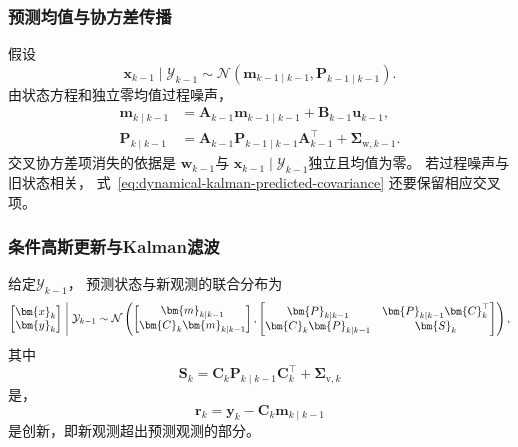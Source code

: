 \subsubsection{预测均值与协方差传播}

假设
\[
	\bm{x}_{k-1}\mid\mathcal{Y}_{k-1}\sim \mathcal{N}( \bm{m}_{k-1\mid k-1}, \bm{P}
	_{k-1\mid k-1}).
\]
由状态方程和独立零均值过程噪声，
\begin{align}
	\bm{m}_{k\mid k-1} & = \bm{A}_{k-1}\bm{m}_{k-1\mid k-1}+\bm{B}_{k-1}\bm{u}_{k-1}, \label{eq:dynamical-kalman-predicted-mean}              \\
	\bm{P}_{k\mid k-1} & = \bm{A}_{k-1}\bm{P}_{k-1\mid k-1}\bm{A}_{k-1}^{\top}+\bm{\Sigma}_{\mathrm{w},k-1}. \label{eq:dynamical-kalman-predicted-covariance}
\end{align}
交叉协方差项消失的依据是 $\bm{w}_{k-1}$与 $\bm{x}_{k-1}\mid\mathcal{Y}_{k-1}$独立且均值为零。
若过程噪声与旧状态相关， 式~\eqref{eq:dynamical-kalman-predicted-covariance} 还要保留相应交叉项。

\subsubsection{条件高斯更新与Kalman滤波}

给定$\mathcal{Y}_{k-1}$， 预测状态与新观测的联合分布为
\begin{equation}
	\begin{bmatrix}
		\bm{x}_{k} \\
		\bm{y}_{k}
	\end{bmatrix}
	\Biggm|\mathcal{Y}_{k-1}\sim \mathcal{N}\left(
	\begin{bmatrix}
		\bm{m}_{k\mid k-1}           \\
		\bm{C}_{k}\bm{m}_{k\mid k-1}
	\end{bmatrix},
	\begin{bmatrix}
		\bm{P}_{k\mid k-1}           & \bm{P}_{k\mid k-1}\bm{C}_{k}^{\top} \\
		\bm{C}_{k}\bm{P}_{k\mid k-1} & \bm{S}_{k}
	\end{bmatrix}
	\right), \label{eq:dynamical-kalman-joint-gaussian}
\end{equation}
其中
\begin{equation}
	\bm{S}_{k}= \bm{C}_{k}\bm{P}_{k\mid k-1}\bm{C}_{k}^{\top}+\bm{\Sigma}_{\mathrm{v},k}\label{eq:dynamical-kalman-innovation-covariance}
\end{equation}
是，
\[
	\bm{r}_{k}= \bm{y}_{k}-\bm{C}_{k}\bm{m}_{k\mid k-1}
\]
是创新，即新观测超出预测观测的部分。

